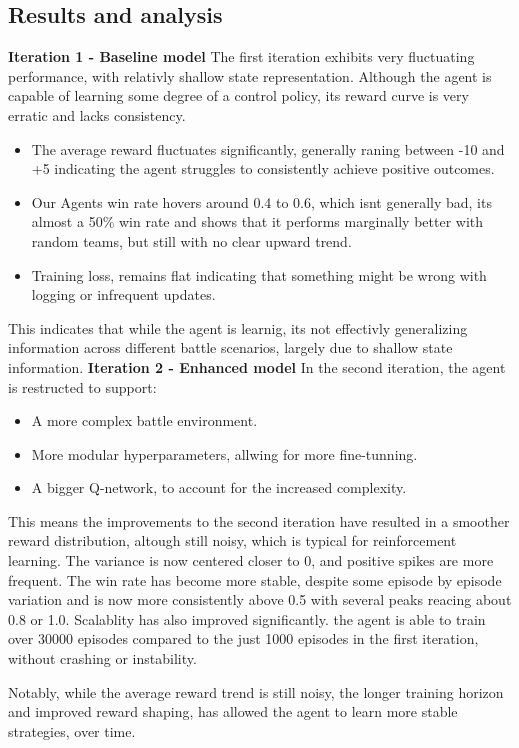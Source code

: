 \subsection{Results and analysis}
\textbf{Iteration 1 - Baseline model}
The first iteration exhibits very fluctuating performance, with relativly shallow
state representation. Although the agent is capable of learning some degree of a control
policy, its reward curve is very erratic and lacks consistency.
\begin{itemize}
    \item The average reward fluctuates significantly, generally raning between -10 and +5
          indicating the agent struggles to consistently achieve positive outcomes.
    \item Our Agents win rate hovers around 0.4 to 0.6, which isnt generally bad, its almost a 50\% win rate
          and shows that it performs marginally better with random teams, but still with no clear upward trend.
    \item Training loss, remains flat indicating that something might be wrong with logging or infrequent updates.
\end{itemize}
This indicates that while the agent is learnig, its not effectivly generalizing
information across different battle scenarios, largely due to shallow state information.
\newline
\textbf{Iteration 2 - Enhanced model}
In the second iteration, the agent is restructed to support:
\begin{itemize}
    \item A more complex battle environment.
    \item More modular hyperparameters, allwing for more fine-tunning.
    \item A bigger Q-network, to account for the increased complexity.
\end{itemize}
This means the improvements to the second iteration have resulted in a smoother reward
distribution, altough still noisy, which is typical for reinforcement learning. The variance
is now centered closer to 0, and positive spikes are more frequent. The win rate
has become more stable, despite some episode by episode variation
and is now more consistently above 0.5 with several peaks reacing about 0.8 or 1.0.
Scalablity has also improved significantly. the agent is able to train over 30000 episodes
compared to the just 1000 episodes in the first iteration, without crashing or instability.

Notably, while the average reward trend is still noisy, the longer training horizon
and improved reward shaping, has allowed the agent to learn more stable strategies, over time.

